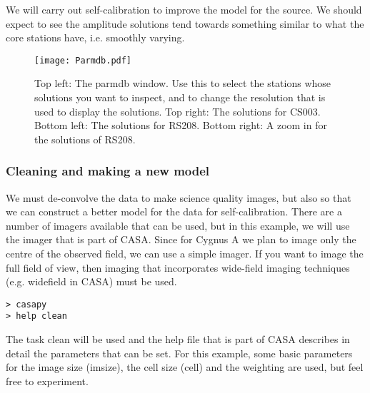 We will carry out self-calibration to improve the model for the source. We should expect to see the amplitude solutions tend towards something similar to what the core stations have, i.e. smoothly varying.

\begin{figure*}[!hb]
\begin{center}
    \texttt{[image: Parmdb.pdf]}
  \caption{Top left: The parmdb window. Use this to select the stations whose solutions you want to inspect, and to change the resolution that is used to display the solutions. Top right: The solutions for CS003. Bottom left: The solutions for RS208. Bottom right: A zoom in for the solutions of RS208.}
  \label{ex:pardb}
  \end{center}
\end{figure*}




\subsubsection{Cleaning and making a new model}

We must de-convolve the data to make science quality images, but also so that we can construct a better model for the data for self-calibration. There are a number of imagers available that can be used, but in this example, we will use the imager that is part of CASA. Since for Cygnus A we plan to image only the centre of the observed field, we can use a simple imager. If you want to image the full field of view, then imaging that incorporates wide-field imaging techniques (e.g. widefield in CASA) must be used.

\begin{verbatim}
> casapy
> help clean
\end{verbatim}

The task clean will be used and the help file that is part of CASA describes in detail the parameters that can be set. For this example, some basic parameters for the image size (imsize), the cell size (cell) and the weighting are used, but feel free to experiment.

